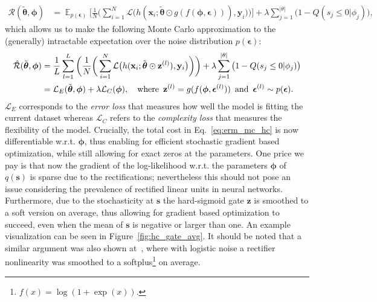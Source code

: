 \documentclass{article} %
\DeclareMathOperator{\E}{\mathbb{E}}
\def\!#1{\boldsymbol{#1}}
\def\*#1{\mathbf{#1}}
\begin{document}
\begin{align}
	\mathcal{R}(\tilde{\!\theta}, \!\phi) & = \E_{p(\!\epsilon)}\bigg[\frac{1}{N}\bigg(\sum_{i=1}^{N}\mathcal{L}\big(h(\*x_i; \tilde{\!\theta}\odot g(f(\!\phi, \!\epsilon))), \*y_i\big)\bigg)\bigg] + \lambda \sum_{j=1}^{|\theta|}\big(1 - Q(s_j \leq 0|\phi_j)\big),
\end{align}
which allows us to make the following Monte Carlo approximation to the (generally) intractable expectation over the noise distribution $p(\!\epsilon)$:
\begin{align}
	\hat{\mathcal{R}}(\tilde{\!\theta}, \!\phi) & = \frac{1}{L}\sum_{l=1}^{L}\bigg(\frac{1}{N}\bigg(\sum_{i=1}^{N}\mathcal{L}\big(h(\*x_i; \tilde{\!\theta}\odot\*z^{(l)}), \*y_i\big)\bigg)\bigg) + \lambda \sum_{j=1}^{|\theta|}\big(1 - Q(s_j \leq 0|\phi_j)\big)\nonumber\\
	& = \mathcal{L}_E(\tilde{\!\theta}, \!\phi) + \lambda \mathcal{L}_C(\!\phi), \quad \text{where} \enskip \*z^{(l)} = g(f(\!\phi, \!\epsilon^{(l)})) \enskip \text{and} \enskip \!\epsilon^{(l)} \sim p(\!\epsilon).\label{eq:erm_mc_hc}
\end{align}
$\mathcal{L}_E$ corresponds to the \emph{error loss} that measures how well the model is fitting the current dataset whereas $\mathcal{L}_C$ refers to the \emph{complexity loss} that measures the flexibility of the model. 
Crucially, the total cost in Eq.~\ref{eq:erm_mc_hc} is now differentiable w.r.t. $\!\phi$, thus enabling for efficient stochastic gradient based optimization, while still allowing for exact zeros at the parameters. 
One price we pay is that now the gradient of the log-likelihood w.r.t. the parameters $\!\phi$ of $q(\*s)$ is sparse due to the rectifications; nevertheless this should not pose an issue considering the prevalence of rectified linear units in neural networks. Furthermore, due to the stochasticity at $\*s$ the hard-sigmoid gate $\*z$ is smoothed to a soft version on average, thus allowing for gradient based optimization to succeed, even when the mean of $\*s$ is negative or larger than one. An example visualization can be seen in Figure~\ref{fig:hc_gate_avg}. It should be noted that a similar argument was also shown at~\cite{bengio2013estimating}, where with logistic noise a rectifier nonlinearity was smoothed to a softplus\footnote{$f(x) = \log(1 + \exp(x)).$} on average.
		
\end{document}
